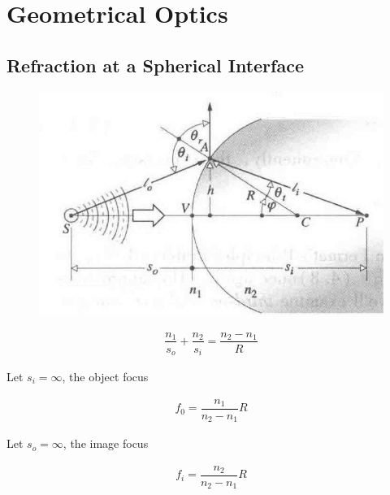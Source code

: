 

\chapter{Geometrical Optics}

\section{Refraction at a Spherical Interface}

\begin{figure}[H]
  \centering
  \includegraphics[width=0.4\linewidth]{figures/Refraction-at-a-Spherical-Interface}
  \label{fig:}
\end{figure}

\begin{equation*}
  \begin{aligned}
    \dfrac{n_1}{s_o} + \dfrac{n_2}{s_i} = \dfrac{n_2 - n_1}{R}   
  \end{aligned}
\end{equation*}

Let $s_i = \infty$, the object focus

\begin{equation*}
  \begin{aligned}
    f_0 = \dfrac{n_1}{n_2 - n_1} R 
  \end{aligned}
\end{equation*}

Let $s_o = \infty$, the image focus

\begin{equation*}
  \begin{aligned}
    f_i = \dfrac{n_2}{n_2 - n_1} R 
  \end{aligned}
\end{equation*}

